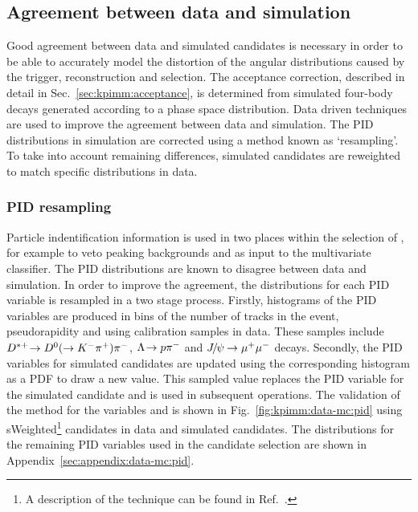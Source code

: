 \subsection{Agreement between data and simulation}
\label{sec:kpimm:data-mc}

Good agreement between data and simulated candidates is necessary in order to be able to accurately model the distortion of the angular distributions caused by the trigger, reconstruction and selection. The acceptance correction, described in detail in Sec.~\ref{sec:kpimm:acceptance}, is determined from simulated four-body \BdToKpimm decays generated according to a phase space distribution. Data driven techniques are used to improve the agreement between data and simulation. The PID distributions in simulation are corrected using a method known as `resampling'. To take into account remaining differences, simulated candidates are reweighted to match specific distributions in data.

\subsubsection{PID resampling}
\label{sec:kpimm:data-mc:resample}

Particle indentification information is used in two places within the selection of \BdToKpimm, for example to veto peaking backgrounds and as input to the multivariate classifier. The PID distributions are known to disagree between data and simulation. In order to improve the agreement, the distributions for each PID variable is resampled in a two stage process. Firstly, histograms of the PID variables are produced in bins of the number of tracks in the event, pseudorapidity and \pt using calibration samples in data. These samples include ${{D}^{*+}}\!\rightarrow {\ensuremath{{D}^0}}(\rightarrow{\ensuremath{{K}^-}}{\ensuremath{{\pi}^+}}){{\pi}^-}$, ${\Lambda}\!\rightarrow {\ensuremath{p}}{\ensuremath{{\pi}^-}}$ and ${{J\mskip -3mu/\mskip -2mu\psi\mskip 2mu}}\!\rightarrow {\ensuremath{\mu^+\mu^-}}$ decays. Secondly, the PID variables for simulated candidates are updated using the corresponding histogram as a PDF to draw a new value. This sampled value replaces the PID variable for the simulated candidate and is used in subsequent operations. The validation of the method for the variables \kaon\dllkpi and \pion\dllkpi is shown in Fig.~\ref{fig:kpimm:data-mc:pid} using sWeighted\footnote{A description of the \sPlot technique can be found in Ref.~\cite{splot}.} \BdToJPsiKst candidates in data and simulated \BdToJPsiKst candidates. The distributions for the remaining PID variables used in the candidate selection are shown in Appendix~\ref{sec:appendix:data-mc:pid}.

